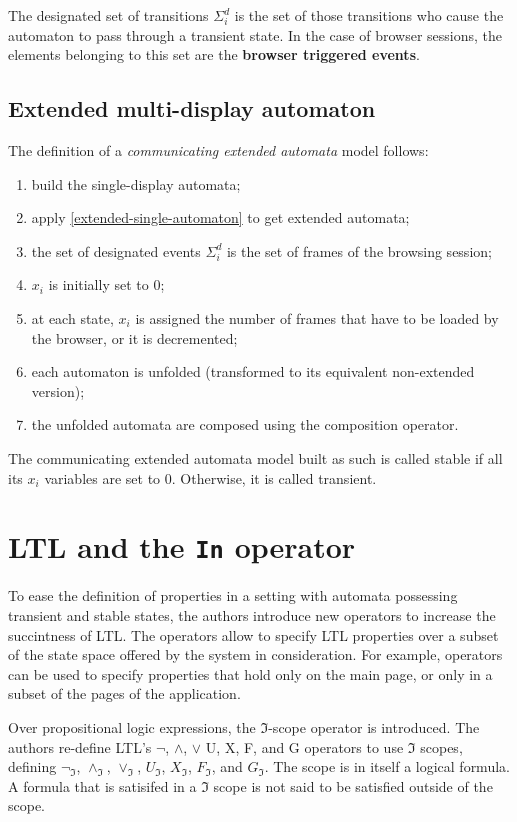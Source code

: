 \documentclass[a4paper,10pt]{article}
\theoremstyle{plain} %
\theoremstyle{definition}
\theoremstyle{remark}
\begin{document}
The designated set of transitions $\Sigma^d_i$ is the set of those transitions who cause the automaton to pass through a transient state. In the case of browser sessions, the elements belonging to this set are the \textbf{browser triggered events}.

\subsection{Extended multi-display automaton}

The definition of a \textit{communicating extended automata} model follows:

\begin{enumerate}
  \item build the single-display automata;
  \item apply \cref{extended-single-automaton} to get extended automata;
  \item the set of designated events $\Sigma^d_i$ is the set of frames of the browsing session;
  \item $x_i$ is initially set to 0;
  \item at each state, $x_i$ is assigned the number of frames that have to be loaded by the browser, or it is decremented;
  \item each automaton is unfolded (transformed to its equivalent non-extended version);
  \item the unfolded automata are composed using the composition operator.
\end{enumerate}

The communicating extended automata model built as such is called stable if all its $x_i$ variables are set to 0. Otherwise, it is called transient.

\section{LTL and the \textbf{\texttt{In}} operator}

To ease the definition of properties in a setting with automata possessing transient and stable states, the authors introduce new operators to increase the succintness of LTL. The operators allow to specify LTL properties over a subset of the state space offered by the system in consideration. For example, operators can be used to specify properties that hold only on the main page, or only in a subset of the pages of the application.

Over propositional logic expressions, the $\mathcal{\Im}$-scope operator is introduced. The authors re-define LTL's $\neg$, $\land$, $\lor$ U, X, F, and G operators to use $\mathcal{\Im}$ scopes, defining $\neg_{\mathcal{\Im}}$, $\land_{\mathcal{\Im}}$, $\lor_{\mathcal{\Im}}$, $U_{\mathcal{\Im}}$, $X_{\mathcal{\Im}}$, $F_{\mathcal{\Im}}$, and $G_{\mathcal{\Im}}$. The scope is in itself a logical formula. A formula that is satisifed in a $\Im$ scope is not said to be satisfied outside of the scope.
\end{document}
